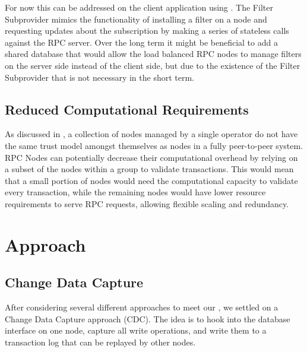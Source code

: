 \documentclass[letterpaper,10pt,english]{sphinxmanual}
\begin{document}
For now this can be addressed on the client application using .
The Filter Subprovider mimics the functionality of installing a filter on a
node and requesting updates about the subscription by making a series of
stateless calls against the RPC server. Over the long term it might be
beneficial to add a shared database that would allow the load balanced RPC
nodes to manage filters on the server side instead of the client side, but due
to the existence of the Filter Subprovider that is not necessary in the short
term.


\section{Reduced Computational Requirements}
\label{\detokenize{topics/goals:reduced-computational-requirements}}
As discussed in {\hyperref[\detokenize{topics/goals:initialization}]{}}, a collection of nodes managed by a
single operator do not have the same trust model amongst themselves as nodes in
a fully peer-to-peer system. RPC Nodes can potentially decrease their
computational overhead by relying on a subset of the nodes within a group to
validate transactions. This would mean that a small portion of nodes would need
the computational capacity to validate every transaction, while the remaining
nodes would have lower resource requirements to serve RPC requests, allowing
flexible scaling and redundancy.


\chapter{Approach}
\label{\detokenize{topics/approach:approach}}\label{\detokenize{topics/approach::doc}}

\section{Change Data Capture}
\label{\detokenize{topics/approach:change-data-capture}}
After considering several different approaches to meet our {\hyperref[\detokenize{topics/goals:design-goals}]{}},
we settled on a Change Data Capture approach (CDC). The idea is to hook into
the database interface on one node, capture all write operations, and write
them to a transaction log that can be replayed by other nodes.
\end{document}
